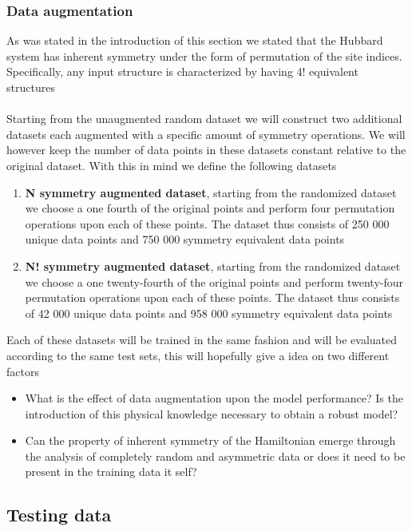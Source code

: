 \documentclass[12pt]{article}
\begin{document}
\subsubsection{Data augmentation}
As was stated in the introduction of this section we stated that the Hubbard system has inherent symmetry under the form of permutation of the site indices. Specifically, any input structure is characterized by having 4! equivalent structures
\\
\\
Starting from the unaugmented random dataset we will construct two additional datasets each augmented with a specific amount of symmetry operations. We will however keep the number of data points in these datasets constant relative to the original dataset. With this in mind we define the following datasets
\begin{enumerate}
	\item \textbf{N symmetry augmented dataset}, starting from the randomized dataset we choose a one fourth of the original points and perform four permutation operations upon each of these points. The dataset thus consists of 250 000 unique data points and 750 000 symmetry equivalent data points
	\item \textbf{N! symmetry augmented dataset}, starting from the randomized dataset we choose a one twenty-fourth of the original points and perform twenty-four permutation operations upon each of these points. The dataset thus consists of 42 000 unique data points and 958 000 symmetry equivalent data points
\end{enumerate}
Each of these datasets will be trained in the same fashion and will be evaluated according to the same test sets, this will hopefully give a idea on two different factors
\begin{itemize}
	\item What is the effect of data augmentation upon the model performance? Is the introduction of this physical knowledge necessary to obtain a robust model?
	\item Can the property of inherent symmetry of the Hamiltonian emerge through the analysis of completely random and asymmetric data or does it need to be present in the training data it self? 
\end{itemize}

\subsection{Testing data}
\end{document}
